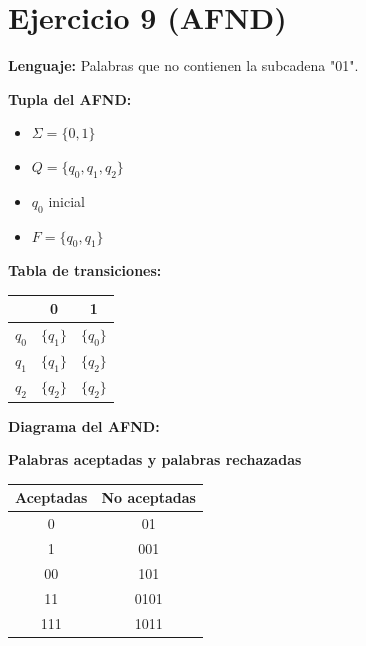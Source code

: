 \documentclass{article}
\begin{document}
\section*{Ejercicio 9 (AFND)}
\textbf{Lenguaje:} Palabras que no contienen la subcadena "01".  

\textbf{Tupla del AFND:}
\begin{itemize}
    \item $\Sigma = \{0,1\}$
    \item $Q = \{q_0,q_1,q_2\}$
    \item $q_0$ inicial
    \item $F = \{q_0,q_1\}$
\end{itemize}

\textbf{Tabla de transiciones:}
\begin{center}
\begin{tabular}{|c|c|c|}
\hline
 & 0 & 1 \\ \hline
$q_0$ & $\{q_1\}$ & $\{q_0\}$ \\ \hline
$q_1$ & $\{q_1\}$ & $\{q_2\}$ \\ \hline
$q_2$ & $\{q_2\}$ & $\{q_2\}$ \\ \hline
\end{tabular}
\end{center}

\textbf{Diagrama del AFND:}
\begin{center}
\end{center}

\textbf{Palabras aceptadas y palabras rechazadas}
\begin{center}
\begin{tabular}{|c|c|}
\hline
Aceptadas & No aceptadas \\
\hline
0 & 01 \\
1 & 001 \\
00 & 101 \\
11 & 0101 \\
111 & 1011 \\
\hline
\end{tabular}
\end{center}
\end{document}
